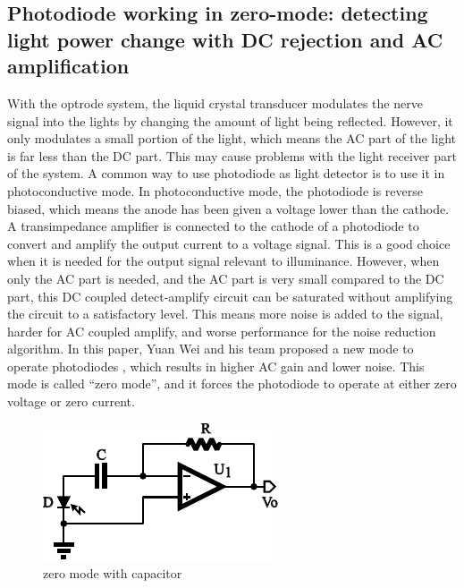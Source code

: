 \subsection{Photodiode working in zero-mode: detecting light power change with DC rejection and AC amplification}

With the optrode system, the liquid crystal transducer modulates the nerve signal into the lights by changing the amount of light being reflected.  However, it only modulates a small portion of the light, which means the AC part of the light is far less than the DC part.  This may cause problems with the light receiver part of the system.
A common way to use photodiode as light detector is to use it in photoconductive mode.  In photoconductive mode, the photodiode is reverse biased, which means the anode has been given a voltage lower than the cathode.  A transimpedance amplifier is connected to the cathode of a photodiode to convert and amplify the output current to a voltage signal.  This is a good choice when it is needed for the output signal relevant to illuminance.  However, when only the AC part is needed, and the AC part is very small compared to the DC part, this DC coupled detect-amplify circuit can be saturated without amplifying the circuit to a satisfactory level.  This means more noise is added to the signal, harder for AC coupled amplify, and worse performance for the noise reduction algorithm.
In this paper, Yuan Wei and his team proposed a new mode to operate photodiodes \cite{zero-mode_detection}, which results in higher AC gain and lower noise.  This mode is called “zero mode”, and it forces the photodiode to operate at either zero voltage or zero current.  

\begin{figure}[htbp]
\centerline{\includegraphics[width=0.6\linewidth]{zero_mode_sch.pdf}}
\caption{zero mode with capacitor}
\label{fig_zero_mode_sch}
\end{figure}

